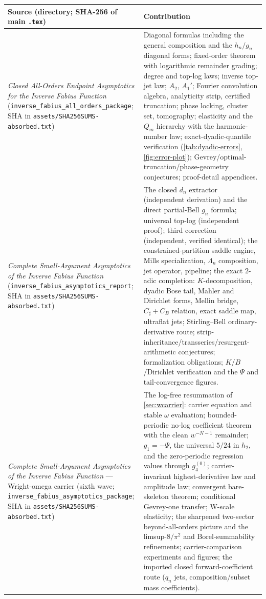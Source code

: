 \documentclass[11pt,oneside]{article}
\numberwithin{equation}{section}
\theoremstyle{definition}
\theoremstyle{remark}
\newcommand{\Csharp}{C_{\sharp}}
\newcommand{\CB}{C_{B}}
\begin{document}
\begin{center}
\small
\begin{tabular}{@{}p{}p{}@{}}
\toprule
Source (directory; SHA-256 of main \texttt{.tex}) & Contribution \\
\midrule
\emph{Closed All-Orders Endpoint Asymptotics for the Inverse Fabius
Function}
(\nolinkurl{inverse_fabius_all_orders_package}; SHA in
\nolinkurl{assets/SHA256SUMS-absorbed.txt})
& Diagonal formulas including the general composition and the
$h_n/g_n$ diagonal forms; fixed-order theorem with logarithmic
remainder grading; degree and top-log laws; inverse top-jet law;
$A_2$, $A_1'$; Fourier convolution algebra, analyticity strip,
certified truncation; phase locking, cluster set, tomography;
elasticity and the $Q_m$ hierarchy with the harmonic-number law;
exact-dyadic-quantile verification (\cref{tab:dyadic-errors},
\cref{fig:error-plot}); Gevrey/optimal-truncation/phase-geometry
conjectures; proof-detail appendices. \\
\addlinespace
\emph{Complete Small-Argument Asymptotics of the Inverse Fabius
Function}
(\nolinkurl{inverse_fabius_asymptotics_report}; SHA in
\nolinkurl{assets/SHA256SUMS-absorbed.txt})
& The closed $d_n$ extractor (independent derivation) and the direct
partial-Bell $g_n$ formula; universal top-log (independent proof);
third correction (independent, verified identical); the
constrained-partition saddle engine, Mills specialization,
$\Lambda_n$ composition, jet operator, pipeline; the exact
$2$-adic completion: $K$-decomposition, dyadic Bose tail, Mahler and
Dirichlet forms, Mellin bridge, $\Csharp+\CB$ relation, exact saddle
map, ultraflat jets; Stirling--Bell ordinary-derivative route;
strip-inheritance/transseries/resurgent-arithmetic conjectures;
formalization obligations; $K$/$B$/Dirichlet verification and the
$\Psi$ and tail-convergence figures. \\
\addlinespace
\emph{Complete Small-Argument Asymptotics of the Inverse Fabius
Function} --- Wright-omega carrier (sixth wave;
\nolinkurl{inverse_fabius_asymptotics_package}; SHA in
\nolinkurl{assets/SHA256SUMS-absorbed.txt})
& The log-free resummation of \cref{sec:wcarrier}: carrier equation
and stable $\omega$ evaluation; bounded-periodic no-log coefficient
theorem with the clean $w^{-N-1}$ remainder; $g_1=-\Psi$, the
universal $5/24$ in $h_2$, and the zero-periodic regression values
through $g_4^{(0)}$; carrier-invariant highest-derivative law and
amplitude law; convergent bare-skeleton theorem; conditional
Gevrey-one transfer; W-scale elasticity; the sharpened
two-sector beyond-all-orders picture and the limsup-$8/\pi^{2}$ and
Borel-summability refinements; carrier-comparison experiments and
figures; the imported closed forward-coefficient route
($q_n$ jets, composition/subset mass coefficients). \\
\bottomrule
\end{tabular}
\end{center}
\end{document}
